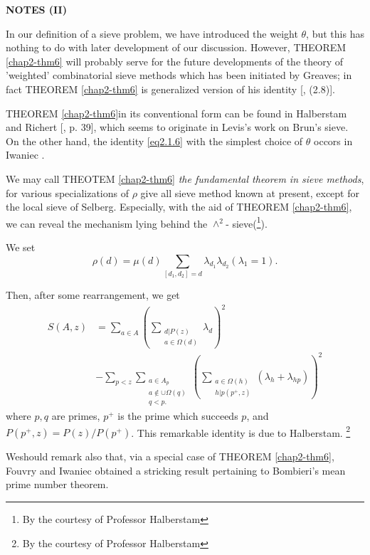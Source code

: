 \begin{center}
\textbf{NOTES (II)}
\end{center}

In our definition of a sieve problem, we have introduced the weight
$\theta$, but this has nothing to do with later development of our
discussion. However, THEOREM \ref{chap2-thm6} will probably serve for the future
developments of the theory of 'weighted' combinatorial sieve methods
which has been initiated by Greaves; in fact THEOREM \ref{chap2-thm6} is
generalized version of his identity [\cite{key20}, (2.8)]. 

THEOREM \ref{chap2-thm6}\pageoriginale in its conventional form can be
found in Halberstam and 
Richert [\cite{key21}, p. 39], which seems to originate in Levis's
work \cite{key44} 
on Brun's sieve. On the other hand, the identity \eqref{eq2.1.6} with the
simplest choice of $\theta$ occors in Iwaniec \cite{key30}. 

We may call THEOTEM \ref{chap2-thm6} \textit{the fundamental theorem in sieve
  methods}, for various specializations of $\rho$ give all sieve
method known at present, except for the local sieve of Selberg.
Especially, with the aid of THEOREM \ref{chap2-thm6}, 
we can reveal the mechanism
lying behind the $\wedge^2$- sieve(\footnote[1]{By the courtesy of
  Professor Halberstam}). 

We set 
$$
\rho(d) = \mu(d) \sum_{[d_1,d_2]= d} \lambda_{d_1} \lambda_{d_2} (\lambda_1 = 1).
$$

Then, after some rearrangement, we get
\begin{align*}
  S(A,z) & = \sum_{a \in A} (\sum_{\substack{ d|P(z)\\ a \in \Omega(d)}}
  \lambda_d)^2 \\ 
  & - \sum_{p < z} \sum_{\substack{ a \in A_p \\ a \notin \cup \Omega
      (q) \\ q < p.}} (\sum_{\substack{ a \in \Omega(h) \\ h|p(p^+, z
      )}} (\lambda_h + \lambda_{hp}))^2  
\end{align*}
where $p,q$ are primes, $p^+$ is the prime which succeeds $p$, and
$P(p^+,  z) = P(z) /P(p^+)$. This remarkable identity is due to
Halberstam. \footnote{By the courtesy of Professor Halberstam} 

We\pageoriginale should remark also that, via a special case of
THEOREM \ref{chap2-thm6}, Fouvry 
and Iwaniec \cite{key13} obtained a stricking result pertaining to
Bombieri's mean prime number theorem.	 

